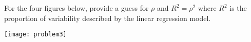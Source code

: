 \item For the four figures below, provide a guess for $\rho$ and $R^2=\rho^2$ where $R^2$ is the proportion of variability described by the linear regression model.  

\texttt{[image: problem3]}

